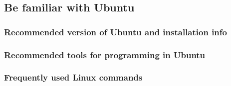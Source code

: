 \subsection{Be familiar with Ubuntu}
\subsubsection{Recommended version of Ubuntu and installation info}
\subsubsection{Recommended tools for programming in Ubuntu}
\subsubsection{Frequently used Linux commands}

